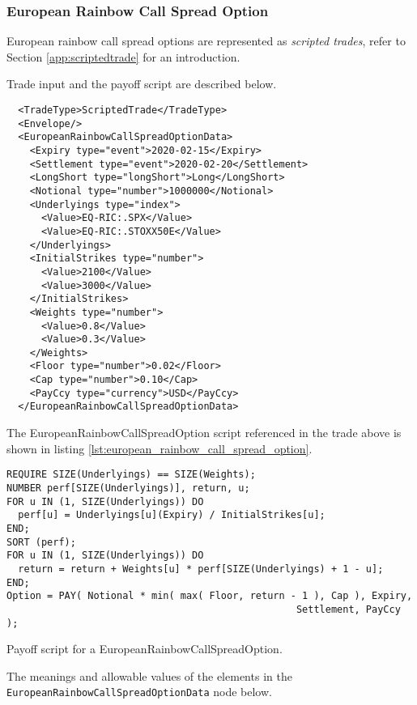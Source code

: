 \subsubsection*{European Rainbow Call Spread Option}

European rainbow call spread options are represented as {\em scripted trades}, refer to
Section \ref{app:scriptedtrade} for an introduction.

Trade input and the payoff script are described below.

\begin{verbatim}
  <TradeType>ScriptedTrade</TradeType>
  <Envelope/>
  <EuropeanRainbowCallSpreadOptionData>
    <Expiry type="event">2020-02-15</Expiry>
    <Settlement type="event">2020-02-20</Settlement>
    <LongShort type="longShort">Long</LongShort>
    <Notional type="number">1000000</Notional>
    <Underlyings type="index">
      <Value>EQ-RIC:.SPX</Value>
      <Value>EQ-RIC:.STOXX50E</Value>
    </Underlyings>
    <InitialStrikes type="number">
      <Value>2100</Value>
      <Value>3000</Value>
    </InitialStrikes>
    <Weights type="number">
      <Value>0.8</Value>
      <Value>0.3</Value>
    </Weights>
    <Floor type="number">0.02</Floor>
    <Cap type="number">0.10</Cap>
    <PayCcy type="currency">USD</PayCcy>
  </EuropeanRainbowCallSpreadOptionData>
\end{verbatim}

The EuropeanRainbowCallSpreadOption script referenced in the trade above is shown in listing
\ref{lst:european_rainbow_call_spread_option}.

\begin{listing}[hbt]
\begin{verbatim}
REQUIRE SIZE(Underlyings) == SIZE(Weights);
NUMBER perf[SIZE(Underlyings)], return, u;
FOR u IN (1, SIZE(Underlyings)) DO
  perf[u] = Underlyings[u](Expiry) / InitialStrikes[u];
END;
SORT (perf);
FOR u IN (1, SIZE(Underlyings)) DO
  return = return + Weights[u] * perf[SIZE(Underlyings) + 1 - u];
END;
Option = PAY( Notional * min( max( Floor, return - 1 ), Cap ), Expiry,
                                                  Settlement, PayCcy );
\end{verbatim}
\caption{Payoff script for a EuropeanRainbowCallSpreadOption.}
\label{lst:european_rainbow_call_spread_option}
\end{listing}

The meanings and allowable values of the elements in the \lstinline!EuropeanRainbowCallSpreadOptionData! node below.

